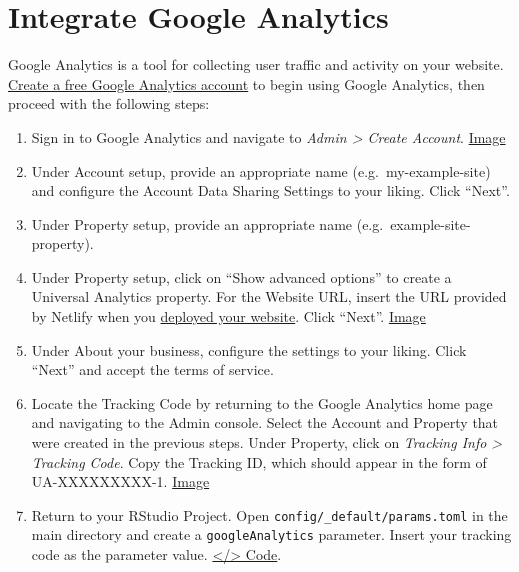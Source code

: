 \documentclass[
]{book}
\begin{document}
\hypertarget{integrate-google-analytics}{%
\section{Integrate Google Analytics}\label{integrate-google-analytics}}

Google Analytics is a tool for collecting user traffic and activity on your website. \href{https://marketingplatform.google.com/about/analytics/}{Create a free Google Analytics account} to begin using Google Analytics, then proceed with the following steps:

\begin{enumerate}
\def\labelenumi{\arabic{enumi}.}
\item
  Sign in to Google Analytics and navigate to \emph{Admin \textgreater{} Create Account}. \href{https://i.imgur.com/QRTa07k.png}{Image}
\item
  Under Account setup, provide an appropriate name (e.g.~my-example-site) and configure the Account Data Sharing Settings to your liking. Click ``Next''.
\item
  Under Property setup, provide an appropriate name (e.g.~example-site-property).
\item
  Under Property setup, click on ``Show advanced options'' to create a Universal Analytics property. For the Website URL, insert the URL provided by Netlify when you \protect\hyperlink{demo-deploy}{deployed your website}. Click ``Next''. \href{https://i.imgur.com/aYeAANl.png}{Image}
\item
  Under About your business, configure the settings to your liking. Click ``Next'' and accept the terms of service.
\item
  Locate the Tracking Code by returning to the Google Analytics home page and navigating to the Admin console. Select the Account and Property that were created in the previous steps. Under Property, click on \emph{Tracking Info \textgreater{} Tracking Code}. Copy the Tracking ID, which should appear in the form of UA-XXXXXXXXX-1. \href{https://i.imgur.com/qcyaVBD.png}{Image}
\item
  Return to your RStudio Project. Open \texttt{config/\_default/params.toml} in the main directory and create a \texttt{googleAnalytics} parameter. Insert your tracking code as the parameter value. \href{https://github.com/dannymorris/r4sites-demo/blob/master/config/_default/params.toml\#L16-L17}{\textless/\textgreater{} Code}.
\end{enumerate}
\end{document}
